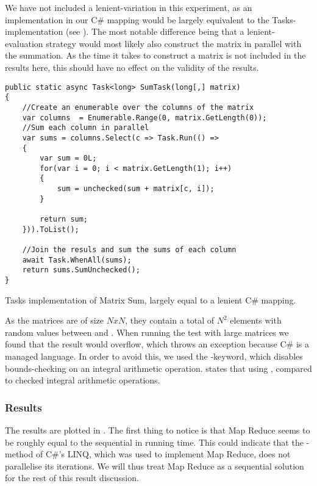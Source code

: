 We have not included a lenient-variation in this experiment, as an implementation in our C\# mapping would be largely equivalent to the Tasks-implementation (see ). The most notable difference being that a lenient-evaluation strategy would most likely also construct the matrix in parallel with the summation. As the time it takes to construct a matrix is not included in the results here, this should have no effect on the validity of the results.
\begin{listing}
\begin{verbatim}
public static async Task<long> SumTask(long[,] matrix)
{
    //Create an enumerable over the columns of the matrix
    var columns  = Enumerable.Range(0, matrix.GetLength(0));
    //Sum each column in parallel
    var sums = columns.Select(c => Task.Run(() =>
    {
        var sum = 0L;
        for(var i = 0; i < matrix.GetLength(1); i++)
        {
            sum = unchecked(sum + matrix[c, i]);
        }

        return sum;
    })).ToList();

    //Join the resuls and sum the sums of each column
    await Task.WhenAll(sums);
    return sums.SumUnchecked();
}
\end{verbatim}
\caption{Tasks implementation of Matrix Sum, largely equal to a lenient C\# mapping.} \label{lst:matrix-sum-csharp}
\end{listing}

As the matrices are of size $N x N$, they contain a total of $N^2$ elements with random values between  and . When running the test with large matrices we found that the result would overflow, which throws an exception because C\# is a managed language. In order to avoid this, we used the -keyword, which disables bounds-checking on an integral arithmetic operation\cite{csharp:unchecked}. \cite{csharp:unchecked} states that using  \textit{}, compared to checked integral arithmetic operations.

\subsubsection{Results}
The results are plotted in . The first thing to notice is that Map Reduce seems to be roughly equal to the sequential in running time. This could indicate that the -method of C\#'s \gls{LINQ}, which was used to implement Map Reduce, does not parallelise its iterations. We will thus treat Map Reduce as a sequential solution for the rest of this result discussion.

